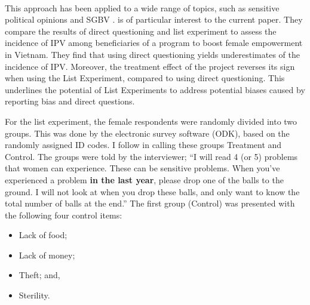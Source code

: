 \documentclass[11pt,a4paper]{scrartcl} %
\begin{document}
\paragraph{}
This approach has been applied to a wide range of topics, such as sensitive political opinions \citep{Frye2017,Blair2014,Meng2017} and SGBV \citep{Bulte2019}. \cite{Bulte2019} is of particular interest to the current paper. They compare the results of direct questioning and list experiment to assess the incidence of IPV among beneficiaries of a program to boost female empowerment in Vietnam. They find that using direct questioning yields underestimates of the incidence of IPV. Moreover, the treatment effect of the project reverses its sign when using the List Experiment, compared to using direct questioning. This underlines the potential of List Experiments to address potential biases caused by reporting bias and direct questions.

For the list experiment, the female respondents were randomly divided into two groups. This was done by the electronic survey software (ODK), based on the randomly assigned ID codes. I follow \cite{Imai2011} in calling these groups Treatment and Control. The groups were told by the interviewer; ``I will read 4 (or 5) problems that women can experience. These can be sensitive problems. When you've experienced a problem \textbf{in the last year}, please drop one of the balls to the ground. I will not look at when you drop these balls, and only want to know the total number of balls at the end.'' The first group (Control) was presented with the following four control items:
\begin{itemize}
	\item Lack of food;
	\item Lack of money;
	\item Theft; and,
	\item Sterility. %
\end{itemize}
\end{document}
